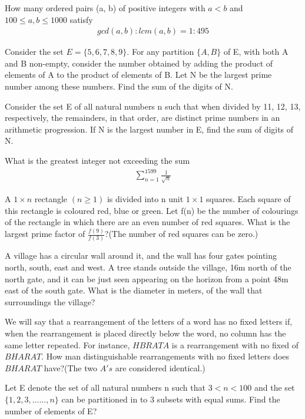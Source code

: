 \item How many ordered pairs (a, b) of positive integers with $a < b$ and $100 \leq a, b \leq 1000$ satisfy 
\begin{align*}
gcd(a, b):lcm(a, b) = 1 : 495
\end{align*}

\item Consider the set $E = \{5, 6, 7, 8, 9\}$. For any partition $\{A, B\}$ of E, with both A and B non-empty, consider the number obtained by adding the product of elements of A to the product of elements of B. Let N be the largest prime number among these numbers. Find the sum of the digits of N.

\item Consider the set E of all natural numbers n such that when divided by 11, 12, 13, respectively, the remainders, in that order, are distinct prime numbers in an arithmetic progression. If N is the largest number in E, find the sum of digits of N.

\item What is the greatest integer not exceeding the sum 
\begin{align*}
\sum_{n = 1}^{1599} \frac{1}{\sqrt{n}}
\end{align*}

\item A $1 \times n$ rectangle $(n \geq 1)$ is divided into n unit $1 \times 1$ squares. Each square of this rectangle is coloured red, blue or green. Let f(n) be the number of colourings of the rectangle in which there are an even number of red squares. What is the largest prime factor of $\frac{f(9)}{f(3)}$?(The number of red squares can be zero.)

\item A village has a circular wall around it, and the wall has four gates pointing north, south, east and west. A tree stands outside the village, 16m north of the north gate, and it can be just seen appearing on the horizon from a point 48m east of the south gate. What is the diameter in meters, of the wall that surroundings the village?

\item We will say that a rearrangement of the letters of a word has no fixed letters if, when the rearrangement is placed directly below the word, no column has the same letter repeated. For instance, $H B R A T A$ is a rearrangement with no fixed of $B H A R A T$. How man distinguishable rearrangements with no fixed letters does $B H A R A T$ have?(The two $A's$ are considered identical.)

\item Let E denote the set of all natural numbers n such that $3 < n < 100$ and the set $\{1, 2, 3,......,n\}$ can be partitioned in to 3 subsets with equal sums. Find the number of elements of E?












